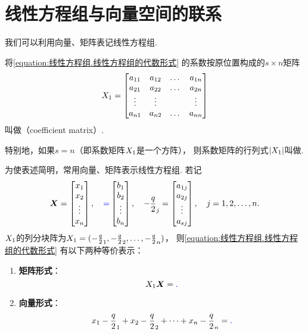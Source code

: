 \section{线性方程组与向量空间的联系}
我们可以利用向量、矩阵表记线性方程组.

\begin{definition}
将\cref{equation:线性方程组.线性方程组的代数形式} 的系数按原位置构成的\(s \times n\)矩阵\[
	X_1 = \begin{bmatrix}
		a_{11} & a_{12} & \dots & a_{1n} \\
		a_{21} & a_{22} & \dots & a_{2n} \\
		\vdots & \vdots & & \vdots \\
		a_{n1} & a_{n2} & \dots & a_{nn}
	\end{bmatrix}
\]叫做（coefficient matrix）.

特别地，如果\(s = n\)（即系数矩阵\(X_1\)是一个方阵），
则系数矩阵的行列式\(\abs{X_1}\)叫做.
\end{definition}

为使表述简明，常用向量、矩阵表示线性方程组.
若记\[
	\boldsymbol{X}=\begin{bmatrix}
		x_1 \\ x_2 \\ \vdots \\ x_n
	\end{bmatrix},
	\quad
	\textcolor{blue}=\begin{bmatrix}
		b_1 \\ b_2 \\ \vdots \\ b_n
	\end{bmatrix},
	\quad
	-\frac{q}{2}_j=\begin{bmatrix}
		a_{1j} \\ a_{2j} \\ \vdots \\ a_{sj}
	\end{bmatrix},
	\quad
	j=1,2,\dotsc,n.
\]
\(X_1\)的列分块阵为\(X_1 = (-\frac{q}{2}_1,-\frac{q}{2}_2,\dotsc,-\frac{q}{2}_n)\)，
则\cref{equation:线性方程组.线性方程组的代数形式} 有以下两种等价表示：
\begin{enumerate}
	\item {\bf 矩阵形式}：
	\begin{equation}
		X_1 \boldsymbol{X} = \textcolor{blue}.
	\end{equation}
	\item {\bf 向量形式}：
	\begin{equation}
		x_1 -\frac{q}{2}_1 + x_2 -\frac{q}{2}_2 + \dotsb + x_n -\frac{q}{2}_n = \textcolor{blue}.
	\end{equation}
\end{enumerate}



